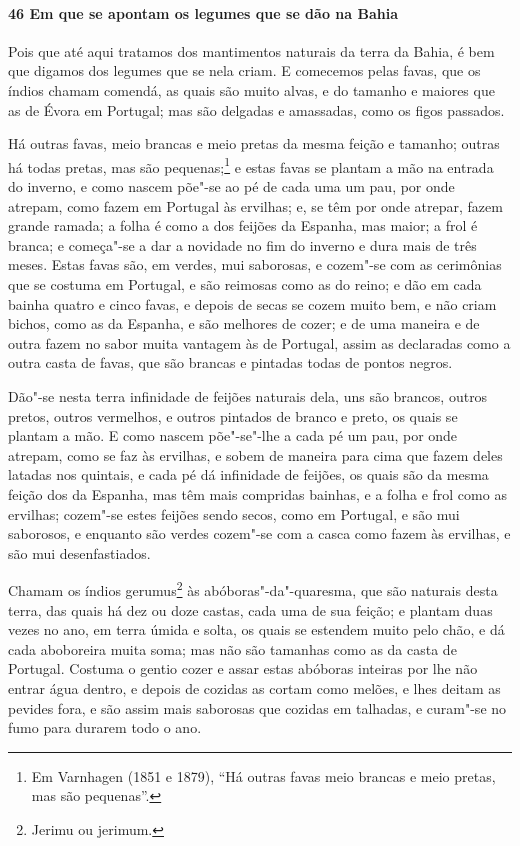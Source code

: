 \begin{linenumbers}
\paragraph{46 Em que se apontam os legumes que se dão na Bahia}\quad
Pois que até aqui tratamos dos mantimentos naturais da terra da Bahia, é bem que digamos
dos legumes que se nela criam. E comecemos pelas favas, que os índios chamam comendá, as
quais são muito alvas, e do tamanho e maiores que as de Évora em Portugal; mas são
delgadas e amassadas, como os figos passados.

Há outras favas, meio brancas e meio pretas da mesma feição e tamanho; outras há todas
pretas, mas são pequenas;\footnote{ Em Varnhagen (1851 e 1879), ``Há outras favas meio
brancas e meio pretas, mas são pequenas''.} e estas favas se plantam a mão na entrada do
inverno, e como nascem põe"-se ao pé de cada uma um pau, por onde atrepam, como fazem em
Portugal às ervilhas; e, se têm por onde atrepar, fazem grande ramada; a folha é como a
dos feijões da Espanha, mas maior; a frol é branca; e começa"-se a dar a novidade no fim do
inverno e dura mais de três meses. Estas favas são, em verdes, mui saborosas, e cozem"-se
com as cerimônias que se costuma em Portugal, e são reimosas como as do reino; e dão em
cada bainha quatro e cinco favas, e depois de secas se cozem muito bem, e não criam
bichos, como as da Espanha, e são melhores de cozer; e de uma maneira e de outra fazem no
sabor muita vantagem às de Portugal, assim as declaradas como a outra casta de favas, que
são brancas e pintadas todas de pontos negros.

Dão"-se nesta terra infinidade de feijões naturais dela, uns são brancos, outros pretos,
outros vermelhos, e outros pintados de branco e preto, os quais se plantam a mão. E como
nascem põe"-se"-lhe a cada pé um pau, por onde atrepam, como se faz às ervilhas, e sobem de
maneira para cima que fazem deles latadas nos quintais, e cada pé dá infinidade de
feijões, os quais são da mesma feição dos da Espanha, mas têm mais compridas bainhas, e a
folha e frol como as ervilhas; cozem"-se estes feijões sendo secos, como em Portugal, e são
mui saborosos, e enquanto são verdes cozem"-se com a casca como fazem às ervilhas, e são
mui desenfastiados.

Chamam os índios gerumus\footnote{ Jerimu ou jerimum.} às abóboras"-da"-quaresma, que são
naturais desta terra, das quais há dez ou doze castas, cada uma de sua feição; e plantam
duas vezes no ano, em terra úmida e solta, os quais se estendem muito pelo chão, e dá cada
aboboreira muita soma; mas não são tamanhas como as da casta de Portugal. Costuma o gentio
cozer e assar estas abóboras inteiras por lhe não entrar água dentro, e depois de cozidas
as cortam como melões, e lhes deitam as pevides fora, e são assim mais saborosas que
cozidas em talhadas, e curam"-se no fumo para durarem todo o ano.


\end{linenumbers}
